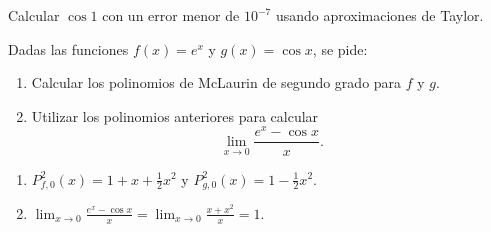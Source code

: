 {Calcular $\cos 1$ con un error menor de $10^{-7}$ usando aproximaciones de Taylor.
}


{Dadas las funciones
$f(x)=e^x$ y $g(x)=\cos x$, se pide:
\begin{enumerate}
   \item  Calcular los polinomios de McLaurin de segundo grado para $f$
   y $g$.

   \item  Utilizar los polinomios anteriores para calcular
   \[ \lim_{x\rightarrow 0}\frac{e^x-\cos x}{x}.\]
\end{enumerate}
}
{\begin{enumerate}
\item $P^2_{f,0}(x) = 1+x+\frac{1}{2}x^2$ y $P^2_{g,0}(x) = 1-\frac{1}{2}x^2$.
\item $\lim_{x\rightarrow 0}\frac{e^x-\cos x}{x} = \lim_{x\rightarrow 0}\frac{x+x^2}{x} = 1$. 
\end{enumerate}
}
{
}


